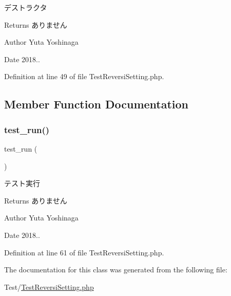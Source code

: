 デストラクタ 

\begin{DoxyReturn}{Returns}
ありません 
\end{DoxyReturn}
\begin{DoxyAuthor}{Author}
Yuta Yoshinaga 
\end{DoxyAuthor}
\begin{DoxyDate}{Date}
2018.. 
\end{DoxyDate}


Definition at line 49 of file Test\+Reversi\+Setting.\+php.



\subsection{Member Function Documentation}
\mbox{\label{class_test_reversi_setting_a9b029832cfdf19c0ef36b1f5ef7b7735}} 
\subsubsection{\texorpdfstring{test\+\_\+run()}{test\_run()}}
{\footnotesize\ttfamily test\+\_\+run (\begin{DoxyParamCaption}{ }\end{DoxyParamCaption})}



テスト実行 

\begin{DoxyReturn}{Returns}
ありません 
\end{DoxyReturn}
\begin{DoxyAuthor}{Author}
Yuta Yoshinaga 
\end{DoxyAuthor}
\begin{DoxyDate}{Date}
2018.. 
\end{DoxyDate}


Definition at line 61 of file Test\+Reversi\+Setting.\+php.



The documentation for this class was generated from the following file\+:\begin{DoxyCompactItemize}
\item 
Test/\hyperlink{_test_reversi_setting_8php}{Test\+Reversi\+Setting.\+php}\end{DoxyCompactItemize}
